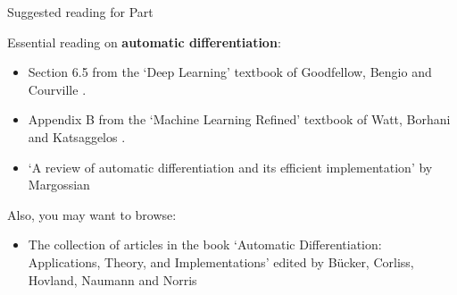 %
%
%

\begin{frame}{Suggested reading for Part \thispart}

    {
        \small
        Essential reading on {\bf automatic differentiation}:
        \begin{itemize}
            \scriptsize
            \item Section 6.5 from the `Deep Learning' 
            textbook of Goodfellow, Bengio and Courville \cite{Goodfellow:2017MITDL}.
            \item Appendix B from the `Machine Learning Refined' 
            textbook of Watt, Borhani and Katsaggelos \cite{Watt:2016Cambridge}.
            \item `A review of automatic differentiation and its 
            efficient implementation' by Margossian \cite{Margossian:2019ad}
        \end{itemize}
        
        Also, you may want to browse:
        \begin{itemize}
            \scriptsize
            \item The collection of articles
             in the book `Automatic Differentiation: Applications, Theory, and Implementations'
             edited by B{\"u}cker, Corliss, Hovland, Naumann and Norris \cite{Bucker:2005ABo}
        \end{itemize}
    }
    

\end{frame}